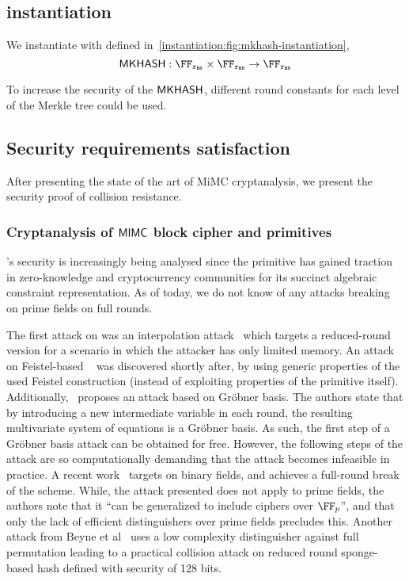 \subsection{\mkhash{} instantiation}
We instantiate \mkhash{} with \mimcSevenMPPrime{} defined in~\cref{instantiation:fig:mkhash-instantiation},
\[
    \mkhash : \FFx{\rBN} \times \FFx{\rBN} \to \FFx{\rBN}
\]

\begin{remark}
    To increase the security of the $\mathsf{\mathsf{MKHASH}}$, different round constants for each level of the Merkle tree could be used.
\end{remark}

\subsection{Security requirements satisfaction}\label{instantiation:mkhash:security}

After presenting the state of the art of MiMC cryptanalysis, we present the security proof of \mimcMPPrime{} collision resistance.

\subsubsection{Cryptanalysis of $\mathsf{MIMC{}}$ block cipher and primitives}\label{instantiation:mkhash:security:cryptanalysis}

\mimc{}'s security is increasingly being analysed since the primitive has gained traction in zero-knowledge and cryptocurrency communities for its succinct algebraic constraint representation. As of today, we do not know of any attacks breaking \mimc{} on prime fields on full rounds.

The first attack on \mimc{} was an interpolation attack~\cite{li2019improved} which targets a reduced-round version for a scenario in which the attacker has only limited memory.
An attack on Feistel-based \mimc{}~\cite{bonnetain2019collisions} was discovered shortly after, by using generic properties of the used Feistel construction (instead of exploiting properties of the primitive itself).
Additionally,~\cite{albrecht2019algebraic} proposes an attack based on Gr\"{o}bner basis. The authors state that by introducing a new intermediate variable in each round, the resulting multivariate system of equations is a Gr\"{o}bner basis. As such, the first step of a Gr\"{o}bner basis attack can be obtained for free. However, the following steps of the attack are so computationally demanding that the attack becomes infeasible in practice.
A recent work~\cite{cryptoeprint:2020:182} targets \mimc{} on binary fields, and achieves a full-round break of the scheme. While, the attack presented does not apply to prime fields, the authors note that it ``can be generalized to include ciphers over $\FFx{p}$'', and that only the lack of efficient distinguishers over prime fields precludes this.
Another attack from Beyne et al~\cite{cryptoeprint:2020:188} uses a low complexity distinguisher against full \mimc{} permutation leading to a practical collision attack on reduced round sponge-based \mimc{} hash defined with security of 128 bits.

